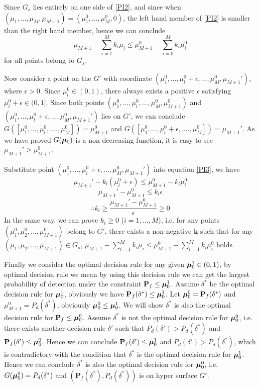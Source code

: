 \documentclass[12pt,journal,a4paper,twoside,onecolumn]{IEEEtran}
\begin{document}
\begin{spacing}{2.5}
Since  $G_s$ lies entirely on one side of \eqref{PI2}, and since when $(\mu_1, ... ,\mu_M, \mu_{M+1})=(\mu_1^0, ..., \mu_M^0, 0)$, the left hand member of \eqref{PI2} is smaller than the right hand member, hence we can conclude 
\begin{equation}
\mu_{M+1} - \sum_{i=1}^{M}k_i\mu_i \leq \mu_{M+1}^0 - \sum_{i=0}^{M}k_i\mu_i^0
\label{PI3}
\end{equation}
for all points belong to $G_s$. 

Now consider a point on the $G'$ with coordinate $(\mu_1^0, ..., \mu_l^0+\epsilon, ..., \mu_M^0, \mu_{M+1}')$, where $\epsilon > 0$. Since $\mu_l^0 \in (0, 1)$, there always exists a positive $\epsilon$ satisfying $\mu_l^0 + \epsilon \in (0, 1]$. Since both points $(\mu_1^0, ..., \mu_l^0, ..., \mu_M^0, \mu_{M+1}^0)$ and $(\mu_1^0, ..., \mu_l^0+\epsilon, ..., \mu_M^0, \mu_{M+1}')$ lies on $G'$, we can conclude $G([\mu_1^0, ..., \mu_l^0, ...., \mu_M^0]) = \mu_{M+1}^0$ and $G([\mu_1^0, ..., \mu_l^0 + \epsilon, ...., \mu_M^0]) = \mu_{M+1}'$. As we have proved $G(\boldsymbol{\mu}_0)$ is a non-decreasing function, it is easy to see $\mu_{M+1}' \geq \mu_{M+1}^0$.

Substitute point $(\mu_1^0, ..., \mu_i^0+\epsilon, ..., \mu_M^0, \mu_{M+1}')$  into equation \eqref{PI3}, we have
\begin{equation}
\mu_{M+1}' - k_l(\mu_l^0+\epsilon)\leq \mu_{M+1}^0 - k_l\mu_l^0
\end{equation}
\begin{equation}
\mu_{M+1}' - \mu_{M+1}^0 \leq k_l\epsilon
\end{equation}
\[
\therefore k_l \geq \frac{\mu_{M+1}' - \mu_{M+1}^0}{\epsilon} \geq 0
\]
In the same way, we can prove $k_i \geq 0$ ($i = 1, ..., M$), i.e. for any points $(\mu_1^0, \mu_2^0, ..., \mu_{M+1}^0)$ belong to $G'$, there exists a non-negative $\mathbf{k}$ such that for any $(\mu_1, \mu_2, ..., \mu_{M+1}) \in G_s$, $\mu_{M+1} - \sum_{i=1}^{M}k_i\mu_i \leq \mu_{M+1}^0 - \sum_{i=1}^{M}k_i\mu_i^0$ holds.

Finally we consider the optimal decision rule for any given $\boldsymbol{\mu}_0^1 \in (0, 1)$, by optimal decision rule we mean by using this decision rule we can get the largest probability of detection under the constraint $\mathbf{P}_f \leq \boldsymbol{\mu}_0^1$.  
Assume  $\delta^\ast$ be the optimal decision rule for $\boldsymbol{\mu}_0^1$, obviously we have $\mathbf{P}_f(\delta^\ast) \leq \boldsymbol{\mu}_0^1$. Let $\boldsymbol{\mu}_0^0 = \mathbf{P}_f(\delta^\ast)$ and $\mu_{M+1}^0 = P_d(\delta^\ast)$, obviously $\boldsymbol{\mu}_0^0 \leq \boldsymbol{\mu}_0^1$. We will show $\delta^\ast$ is also the optimal decision rule for $\mathbf{P}_f \leq \boldsymbol{\mu}_0^0$. Assume $\delta^\ast$ is not the optimal decision rule for $\boldsymbol{\mu}_0^0$, i.e. there exists another decision rule $\delta'$ such that $P_d(\delta') > P_d(\delta^\ast)$ and $\mathbf{P}_f(\delta') \leq \boldsymbol{\mu}_0^0$. Hence we can conclude $\mathbf{P}_f(\delta') \leq \boldsymbol{\mu}_0^1$ and $P_d(\delta') > P_d(\delta^\ast)$, which is contradictory with the condition that $\delta^\ast$ is the optimal decision rule for $\boldsymbol{\mu}_0^1$. Hence we can conclude $\delta^\ast$ is also the optimal decision rule for $\boldsymbol{\mu}_0^0$, i.e. $G(\boldsymbol{\mu}_0^0) = P_d(\delta^\ast)$ and $(\mathbf{P}_f(\delta^\ast), P_d(\delta^\ast))$ is on hyper surface $G'$.


\end{spacing}
\end{document}

